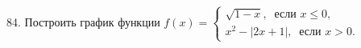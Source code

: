 84. Построить график функции $f(x)=\begin{cases} \sqrt{1-x},\ \text{ если } x\leqslant0,\\
x^2-|2x+1|,\ \text{ если } x>0.\end{cases}$\\
